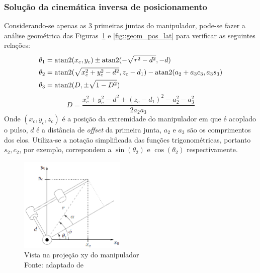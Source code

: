 \subsubsection{Solução da cinemática inversa de posicionamento}

Considerando-se apenas as 3 primeiras juntas do manipulador, pode-se fazer a
análise geométrica das Figuras~\ref{fig::geom_pos_sup} e
\ref{fig::geom_pos_lat} para verificar as seguintes relações:
%
\begin{align}
	\theta_{1} &= \operatorname{atan2}(x_c, y_c) \pm \operatorname{atan2}(-\sqrt{r^2-d^2}, -d)
	\label{eq::theta1}\\
	\theta_{2} &= \operatorname{atan2}(\sqrt{x_c^2+y_c^2-d^2}, z_c-d_1) - \operatorname{atan2}(a_2+a_3
	c_3,a_3 s_3) \\
	\theta_{3} &= \operatorname{atan2}(D, \pm \sqrt{1-D^2}) \label{eq::theta2}
\end{align}
%
\begin{equation*}
		D = \frac{x_c^2+y_c^2-d^2 + (z_c-d_1)^2 - a_2^2 - a_3^2}{2a_2 a_3}
\end{equation*}
%
Onde $(x_c, y_c, z_c)$ é a posição da extremidade do manipulador em que
é acoplado o pulso, $d$ é a distância de \textit{offset} da primeira junta,
$a_2$ e $a_3$ são os comprimentos dos elos. Utiliza-se a notação simplificada
das funções trigonométricas, portanto $s_2, c_2$, por exemplo, correpondem a
$\sin(\theta_2)$ e $\cos(\theta_2)$ respectivamente.


\begin{figure}[h]
	\centering 
 	\includegraphics[width=0.45\textwidth]{figs/geom_pos_sup}
 	\caption[Vista na projeção xy do manipulador]{Vista na projeção xy do manipulador
 	\\ Fonte: adaptado de~\cite{spong2006robot}}
 	\label{fig::geom_pos_sup}
\end{figure}

